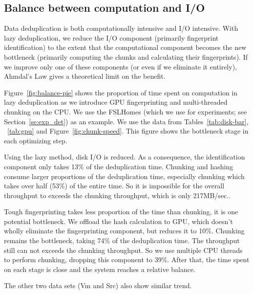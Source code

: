 \documentclass[prodmode,acmtecs]{acmsmall}
\begin{document}
\subsection{Balance between computation and I/O}

Data deduplication is both computationally intensive and I/O intensive.  With lazy deduplication, we reduce the I/O component (primarily fingerprint identification) to the extent that the computational component becomes the new bottleneck (primarily computing the chunks and calculating their fingerprints).  If we improve only one of these components (or even if we eliminate it entirely), Ahmdal's Law gives a theoretical limit on the benefit.

Figure~\ref{fig:balance-pie} shows the proportion of time spent on computation in lazy deduplication as we introduce GPU fingerprinting and multi-threaded chunking on the CPU. We use the FSLHomes (which we use for experiments; see Section~\ref{se:exp_det}) as an example. We use the data from Tables~\ref{tab:disk-bar}, ~\ref{tab:gpu} and Figure~\ref{fig:chunk-speed}. This figure shows the bottleneck stage in each optimizing step.

Using the lazy method, disk I/O is reduced. As a consequence, the identification component only takes 13\% of the deduplication time. Chunking and hashing consume larger proportions of the deduplication time, especially chunking which takes over half (53\%) of the entire time. So it is impossible for the overall throughput to exceeds the chunking throughput, which is only 217MB/sec..

Tough fingerprinting takes less proportion of the time than chunking, it is one potential bottleneck. We offload the hash calculation to GPU, which doesn't wholly eliminate the fingerprinting component, but reduces it to 10\%.  Chunking remains the bottleneck, taking 74\% of the deduplication time. The throughput still can not exceeds the chunking throughput.
So we use multiple CPU threads to perform chunking, dropping this component to 39\%. After that, the time spent on each stage is close and the system reaches a relative balance.

The other two data sets (Vm and Src) also show similar trend.
\end{document}
